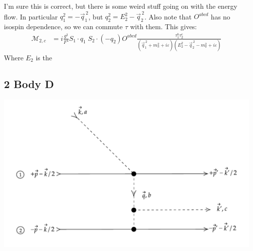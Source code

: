 \documentclass[11pt]{article}
\newcommand\mm{\mathcal{M}}
\newcommand{\sq}{^{\,2}}
\begin{document}
I'm sure this is correct, but there is some weird stuff going on with the energy flow.
In particular $q_1^2 =-\vec{q}_1\sq$, but $q_2^2=E_2^2 - \vec{q}_2\sq$.
Also note that $O^{abcd}$ has no isospin dependence, so we can commute $\tau$ with them. This gives:
\begin{align}
    \mm_{2,c}&=i \frac{g^2}{F^4} S_1 \cdot q_1\; S_2 \cdot(-q_2) O^{abcd}
    \frac{\tau_1^b \tau_2^c}{
        (\vec{q}_1\sq +m_\pi^2 + i \varepsilon)
        (E_2^2-\vec{q}_2\sq-m_\pi^2 + i \varepsilon)
    }
\end{align}
Where $E_2$ is the 
\subsection{2 Body D}
\begin{center}
    \includegraphics[scale=0.6]{2d.pdf}
\end{center}
\end{document}
